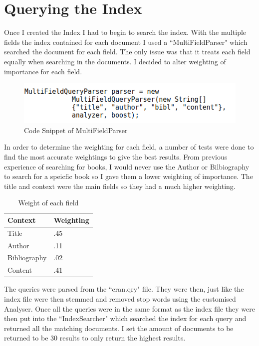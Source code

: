\newpage
\section{Querying the Index}
Once I created the Index I had to begin to search the index. With the multiple fields the index contained for each document I used a ``MultiFieldParser" which searched the document for each field. The only issue was that it treats each field equally when searching in the documents.  I decided to alter weighting of importance for each field. \par

	\begin{figure}[ht!]
		\begin{center}
			\includegraphics[scale=.5 ]{6} 
			\caption{Code Snippet of MultiFieldParser}
			\label{fig:1}
		\end{center}
	\end{figure} \par
  
In order to determine the weighting for each field, a number of tests were done to find the most accurate weightings to give the best results. From previous experience of searching for books, I would never use the Author or Bilbiography to search for a speicfic book so I gave them a lower weighting of importance. The title and context were the main fields so they had a much higher weighting. \par

	\begin{table}[H]
		\centering
		\begin{tabular}{|p{2.5cm}|p{2.5cm}|}
			\hline
			\textbf{Context} 	& \textbf{Weighting} \\ \hline
			Title 				& .45 \\ \hline\hline
			Author 				& .11 \\ \hline\hline
			Bibliography 		& .02 \\ \hline\hline
			Content 			& .41 \\ \hline\hline
		\end{tabular}
		\caption{Weight of each field}
		\label{table:weight}
	\end{table}

The queries were parsed from the ``cran.qry" file. They were then, just like the index file were then stemmed and removed stop words using the customised Analyser. Once all the queries were in the same format as the index file they were then put into the ``IndexSearcher" which searched the index for each query and returned all the matching documents. I set the amount of documents to be returned to be 30 results to only return the highest results.    

